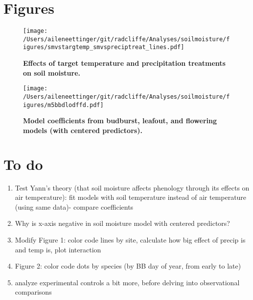 \documentclass{article}
\begin{document}


\clearpage
\section* {Figures}
\clearpage
 \begin{figure}[h]
\centering
 \texttt{[image: /Users/aileneettinger/git/radcliffe/Analyses/soilmoisture/figures/smvstargtemp\_smvspreciptreat\_lines.pdf]}
 \caption{\textbf{Effects of target temperature and precipitation treatments on soil moisture.}} 
 \label{fig:soilmois}
 \end{figure}

\begin{figure}[h]
\centering
 \texttt{[image: /Users/aileneettinger/git/radcliffe/Analyses/soilmoisture/figures/m5bbdlodffd.pdf]}
 \caption{\textbf{Model coefficients from budburst, leafout, and flowering models (with centered predictors).}} 
 \label{fig:bb}
 \end{figure}


\section* {To do}
\begin{enumerate}
\item Test Yann's theory (that soil moisture affects phenology through its effects on air temperature): fit models with soil temperature instead of air temperature (using same data)- compare coefficients
\item Why is x-axis negative in soil moisture model with centered predictors?
\item Modify Figure 1: color code lines by site, calculate how big effect of precip is and temp is, plot interaction
\item Figure 2: color code dots by species (by BB day of year, from early to late)
\item analyze experimental controls a bit more, before delving into observational comparisons
\end{enumerate}


\end{document}
